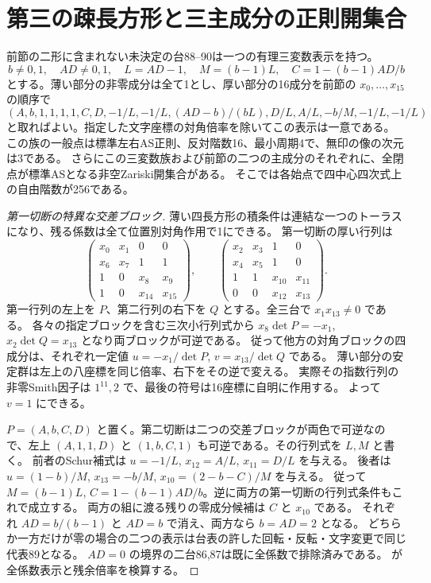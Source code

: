\section{第三の疎長方形と三主成分の正則開集合}
\label{sec:parallel-third-rectangle}
\begin{theorem}\label{thm:parallel-third-rectangle}
前節の二形に含まれない未決定の台88--90は一つの有理三変数表示を持つ。
\[
 b\ne0,1,\quad AD\ne0,1,\quad L=AD-1,\quad M=(b-1)L,\quad C=1-(b-1)AD/b
\]
とする。薄い部分の非零成分は全て1とし、厚い部分の16成分を前節の $x_0,\ldots,x_{15}$ の順序で
\[
 \left(A,b,1,1,1,1,C,D,-1/L,-1/L,
 (AD-b)/(bL),D/L,A/L,-b/M,-1/L,-1/L\right)
\]
と取ればよい。指定した文字座標の対角倍率を除いてこの表示は一意である。
この族の一般点は標準左右AS正則、反対階数16、最小周期4で、無印の像の次元は3である。
さらにこの三変数族および前節の二つの主成分のそれぞれに、全閉点が標準ASとなる非空Zariski開集合がある。
そこでは各始点で四中心四次式上の自由階数が256である。
\end{theorem}
\begin{proof}[第一切断の特異な交差ブロック]
薄い四長方形の積条件は連結な一つのトーラスになり、残る係数は全て位置別対角作用で1にできる。
第一切断の厚い行列は
\[
 \begin{pmatrix}x_0&x_1&0&0\\x_6&x_7&1&1\\1&0&x_8&x_9\\1&0&x_{14}&x_{15}\end{pmatrix},
 \qquad
 \begin{pmatrix}x_2&x_3&1&0\\x_4&x_5&1&0\\1&1&x_{10}&x_{11}\\0&0&x_{12}&x_{13}\end{pmatrix}.
\]
第一行列の左上を $P$、第二行列の右下を $Q$ とする。全三台で $x_1 x_{13}\ne0$ である。
各々の指定ブロックを含む三次小行列式から $x_8\det P=-x_1$, $x_2\det Q=x_{13}$ となり両ブロックが可逆である。
従って他方の対角ブロックの四成分は、それぞれ一定値 $u=-x_1/\det P$, $v=x_{13}/\det Q$ である。
薄い部分の安定群は左上の八座標を同じ倍率、右下をその逆で変える。
実際その指数行列の非零Smith因子は $1^{11},2$ で、最後の符号は16座標に自明に作用する。
よって $v=1$ にできる。

$P=(A,b,C,D)$ と置く。第二切断は二つの交差ブロックが両色で可逆なので、左上
$(A,1,1,D)$ と $(1,b,C,1)$ も可逆である。その行列式を $L,M$ と書く。
前者のSchur補式は $u=-1/L$, $x_{12}=A/L$, $x_{11}=D/L$ を与える。
後者は $u=(1-b)/M$, $x_{13}=-b/M$, $x_{10}=(2-b-C)/M$ を与える。
従って $M=(b-1)L$, $C=1-(b-1)AD/b$。逆に両方の第一切断の行列式条件もこれで成立する。
両方の組に渡る残りの零成分候補は $C$ と $x_{10}$ である。
それぞれ $AD=b/(b-1)$ と $AD=b$ で消え、両方なら $b=AD=2$ となる。
どちらか一方だけが零の場合の二つの表示は台表の許した回転・反転・文字変更で同じ代表89となる。
$AD=0$ の境界の二台86,87は既に全係数で排除済みである。
 が全係数表示と残余倍率を検算する。
\end{proof}

